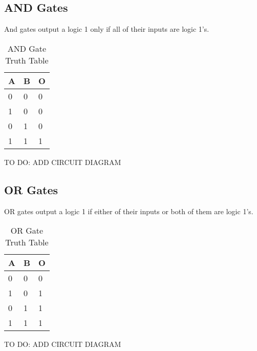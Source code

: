 \subsection{AND Gates}
And gates output a logic 1 only if all of their inputs are logic 1's.
\begin{table}[H]
\centering
\begin{tabular}{l|l|l}
\hline
\multicolumn{1}{|l|}{\textbf{A}} & \textbf{B} & \multicolumn{1}{l|}{\textbf{O}} \\ \hline
0                                & 0          & 0                               \\
1                                & 0          & 0                               \\
0                                & 1          & 0                               \\
1                                & 1          & 1
\end{tabular}
\caption{AND Gate Truth Table}
\label{tab:and-table}
\end{table}
TO DO: ADD CIRCUIT DIAGRAM

\subsection{OR Gates}
OR gates output a logic 1 if either of their inputs or both of them are logic 1's.
\begin{table}[H]
\centering
\begin{tabular}{l|l|l}
\hline
\multicolumn{1}{|l|}{\textbf{A}} & \textbf{B} & \multicolumn{1}{l|}{\textbf{O}} \\ \hline
0                                & 0          & 0                               \\
1                                & 0          & 1                               \\
0                                & 1          & 1                               \\
1                                & 1          & 1
\end{tabular}
\caption{OR Gate Truth Table}
\label{tab:or-table}
\end{table}
TO DO: ADD CIRCUIT DIAGRAM

